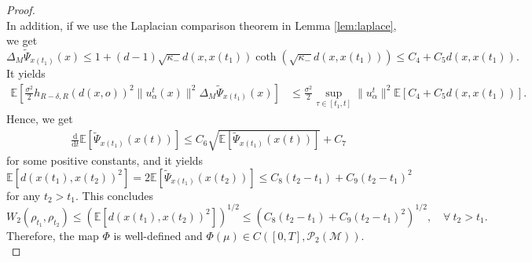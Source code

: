 \documentclass[11pt]{amsart}
\newcommand{\calM}{\mathcal{M}}
\newcommand{\calP}{\mathcal{P}}
\newcommand{\bE}{\mathbb{E}}
\def\d{\mathrm{d}}
\newcommand{\dm}{d} %
\newcommand{\p}{o}%
\newcommand{\dist}{d}%
\begin{document}
\begin{proof}
\[\]
In addition, if we use the Laplacian comparison theorem in Lemma \ref{lem:laplace}, we get
\[
\Delta_M\tilde{\Psi}_{x(t_1)}(x)\leq 1+(\dm-1)\sqrt{\kappa_-}\dist(x, x(t_1))\coth(\sqrt{\kappa_-}\dist(x, x(t_1)))\leq C_4+C_5\dist(x, x(t_1)).
\]
It yields
\begin{align*}
\bE\left[\frac{\sigma^2}{2}h_{R-\delta, R}(\dist(x, \p))^2\|u_\alpha^t(x)\|^2\Delta_M\tilde{\Psi}_{x(t_1)}(x)\right]&\leq \frac{\sigma^2}{2}\sup_{\tau\in[t_1, t]}\|u_\alpha^t\|^2\bE\left[C_4+C_5\dist(x, x(t_1))\right].
\end{align*}
Hence, we get
\begin{align*}
&\frac{\d}{\d t}\bE[\tilde{\Psi}_{x(t_1)}(x(t))]\leq C_6\sqrt{\bE[\tilde{\Psi}_{x(t_1)}(x(t))]}+C_7
\end{align*}
for some positive constants, and it yields
\[
\bE[\dist(x(t_1), x(t_2))^2]=2\bE[\tilde{\Psi}_{x(t_1)}(x(t_2))]\leq C_8(t_2-t_1)+C_9(t_2-t_1)^2
\]
for any $t_2>t_1$. This concludes
\begin{equation*}
W_2(\rho_{t_1},\rho_{t_2})\leq  \left(\bE[d(x(t_1),x(t_2))^2]\right)^{1/2}\leq \left(C_8(t_2-t_1)+C_9(t_2-t_1)^2\right)^{1/2},\quad\forall~t_2>t_1.
\end{equation*}
Therefore, the map $\Phi$ is well-defined and $\Phi(\mu)\in C([0,T],\calP_2(\calM))$.\\


\end{proof}
\end{document}
